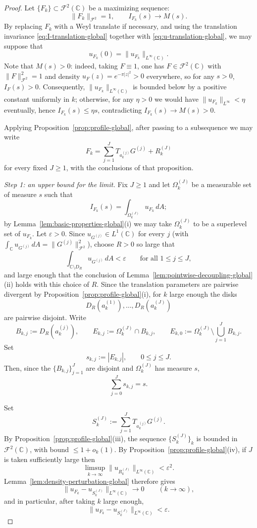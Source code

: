 \documentclass[a4paper,11pt,reqno]{amsart}
\numberwithin{equation}{section}
\theoremstyle{plain} %
\theoremstyle{definition} %
\theoremstyle{remark}
\newcommand{\C}{\mathbb{C}}
\begin{document}
\begin{proof}
Let \(\{F_k\}\subset \mathcal F^2(\C)\) be a maximizing sequence:
\[
\|F_k\|_{\mathcal F^2}=1,
\qquad
I_{F_k}(s)\to M(s).
\]
By replacing \(F_k\) with a Weyl translate if necessary, and using the
translation invariance \eqref{eq:I-translation-global} together with
\eqref{eq:u-translation-global}, we may suppose that
\[
u_{F_k}(0)=\|u_{F_k}\|_{L^\infty(\C)}.
\]
Note that \(M(s)>0\): indeed, taking \(F\equiv 1\), one has
\(F\in \mathcal F^2(\C)\) with \(\|F\|_{\mathcal F^2}^2=1\) and density
\(u_F(z)=e^{-\pi |z|^2}>0\) everywhere, so for any \(s>0\), \(I_F(s)>0\).
Consequently, \(\|u_{F_k}\|_{L^\infty(\C)}\) is bounded below by a positive
constant uniformly in \(k\); otherwise, for any \(\eta>0\) we would have
\(\|u_{F_k}\|_{L^\infty}<\eta\) eventually, hence \(I_{F_k}(s)\le \eta s\),
contradicting \(I_{F_k}(s)\to M(s)>0\).

Applying Proposition~\ref{prop:profile-global}, after passing to a
subsequence we may write
\[
F_k=\sum_{j=1}^J T_{a_k^{(j)}}G^{(j)}+R_k^{(J)}
\]
for every fixed \(J\ge 1\), with the conclusions of that proposition.

\medskip
\noindent\emph{Step 1: an upper bound for the limit.}
Fix \(J\ge 1\) and let \(\Omega_k^{(J)}\) be a measurable set of measure
\(s\) such that
\[
I_{F_k}(s)=\int_{\Omega_k^{(J)}} u_{F_k}\,dA;
\]
by Lemma~\ref{lem:basic-properties-global}(i) we may take
\(\Omega_k^{(J)}\) to be a superlevel set of \(u_{F_k}\). Let
\(\varepsilon>0\). Since \(u_{G^{(j)}}\in L^1(\C)\) for every \(j\) (with
\(\int_\C u_{G^{(j)}}\,dA=\|G^{(j)}\|_{\mathcal F^2}^2\)), choose \(R>0\) so
large that
\[
\int_{\C\setminus D_R} u_{G^{(j)}}\,dA<\varepsilon
\qquad\text{for all } 1\le j\le J,
\]
and large enough that the conclusion of
Lemma~\ref{lem:pointwise-decoupling-global}(ii) holds with this choice of
\(R\). Since the translation parameters are pairwise divergent by
Proposition~\ref{prop:profile-global}(i), for \(k\) large enough the disks
\[
D_R(a_k^{(1)}),\dots,D_R(a_k^{(J)})
\]
are pairwise disjoint. Write
\[
B_{k,j}:=D_R(a_k^{(j)}),
\qquad
E_{k,j}:=\Omega_k^{(J)}\cap B_{k,j},
\qquad
E_{k,0}:=\Omega_k^{(J)}\setminus \bigcup_{j=1}^J B_{k,j}.
\]
Set
\[
s_{k,j}:=|E_{k,j}|,
\qquad 0\le j\le J.
\]
Then, since the \(\{B_{k,j}\}_{j=1}^J\) are disjoint and
\(\Omega_k^{(J)}\) has measure \(s\),
\[
\sum_{j=0}^J s_{k,j}=s.
\]

Set
\[
S_k^{(J)}:=\sum_{j=1}^J T_{a_k^{(j)}}G^{(j)}.
\]
By Proposition~\ref{prop:profile-global}(iii), the sequence
\(\{S_k^{(J)}\}_k\) is bounded in \(\mathcal F^2(\C)\), with bound
\(\le 1+o_k(1)\). By Proposition~\ref{prop:profile-global}(iv), if \(J\) is
taken sufficiently large then
\[
\limsup_{k\to\infty}\|u_{R_k^{(J)}}\|_{L^\infty(\C)}<\varepsilon^2.
\]
Lemma~\ref{lem:density-perturbation-global} therefore gives
\[
\|u_{F_k}-u_{S_k^{(J)}}\|_{L^\infty(\C)}\to 0
\qquad (k\to\infty),
\]
and in particular, after taking \(k\) large enough,
\begin{equation}\label{eq:density-approximation-global}
\|u_{F_k}-u_{S_k^{(J)}}\|_{L^\infty(\C)}<\varepsilon.
\end{equation}


\end{proof}
\end{document}
